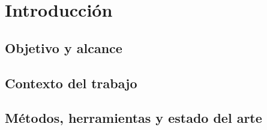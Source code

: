 \documentclass[a4paper,11pt]{report}
\begin{document}


\clearpage
\tableofcontents

\clearpage
\listoffigures

\clearpage
\listoftables

\clearpage
\lstlistoflistings


% 


\clearpage
{}
\setcounter{page}{1}


\chapter{Introducción}
\label{chap:introduccion}

\lipsum[1]

\section{Objetivo y alcance}

\lipsum[2]

\section{Contexto del trabajo}

\lipsum[3]

\section{Métodos, herramientas y estado del arte}
\end{document}
